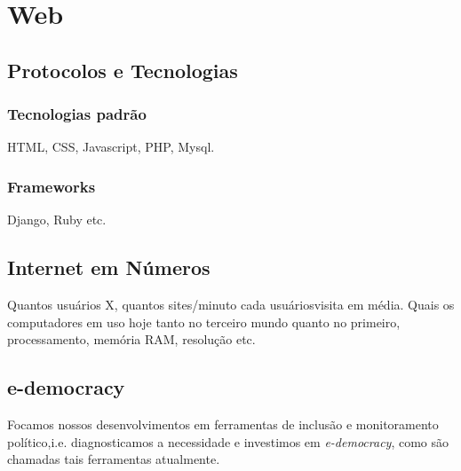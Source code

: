 \section{Web}

\subsection{Protocolos e Tecnologias}

\subsubsection{Tecnologias padrão}
HTML, CSS, Javascript, PHP, Mysql.

\subsubsection{Frameworks}
Django, Ruby etc.

\subsection{Internet em Números}

Quantos usuários X, quantos sites/minuto cada usuáriosvisita em média.
Quais os computadores em uso hoje tanto no terceiro mundo quanto no primeiro,
processamento, memória RAM, resolução etc.

\subsection{e-democracy}

Focamos nossos desenvolvimentos em ferramentas de inclusão
e monitoramento político,i.e. diagnosticamos a necessidade
e investimos em \emph{e-democracy}, como são chamadas tais ferramentas atualmente.
